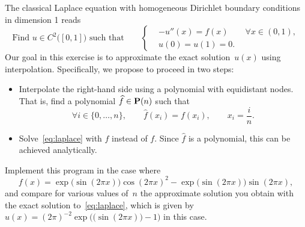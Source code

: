 \begin{compexercise}
    The classical Laplace equation with homogeneous Dirichlet boundary conditions in dimension 1 reads
    \begin{equation}
        \label{eq:laplace}
        \text{Find $u \in C^2\bigl([0, 1]\bigr)$ such that}
        \qquad
        \left\{
        \begin{aligned}
        &- u''(x) = f(x) \qquad \forall x \in (0, 1), \\
        &u(0) = u(1) = 0.
        \end{aligned}
        \right.
    \end{equation}
    Our goal in this exercise is to approximate the exact solution~$u(x)$ using interpolation.
    Specifically,
    we propose to proceed in two steps:
    \begin{itemize}
        \item
            Interpolate the right-hand side using a polynomial with equidistant nodes.
            That is, find a polynomial $\widehat f \in \mathbf P(n)$ such that
            \[
                \forall i \in \{0, \dotsc, n\}, \qquad
                \widehat f(x_i) = f(x_i), \qquad x_i = \frac{i}{n}.
            \]

        \item
            Solve~\eqref{eq:laplace} with $\widehat f$ instead of $f$.
            Since $\widehat f$ is a polynomial, this can be achieved analytically.
    \end{itemize}
    Implement this program in the case where
    \[
        f(x) = \exp\bigl(\sin(2\pi x)\bigr) \cos(2 \pi x)^2 - \exp\bigl(\sin(2 \pi x)\bigr)  \sin(2 \pi x),
    \]
    and compare for various values of~$n$ the approximate solution you obtain with
    the exact solution to~\eqref{eq:laplace},
    which is given by $u(x) = (2\pi)^{-2} \exp \bigl(\bigl( \sin(2\pi x) \bigr) - 1\bigr)$ in this case.
\end{compexercise}

